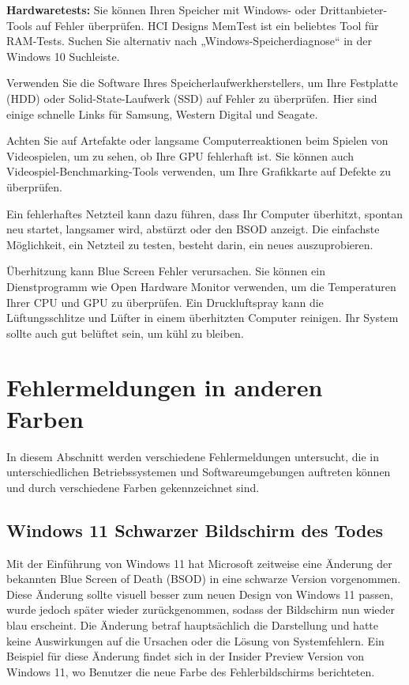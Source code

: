 \documentclass[paper=a4,fontsize=12pt,ngerman,parskip=half]{scrartcl}
\begin{document}
\textbf{Hardwaretests:} Sie können Ihren Speicher mit Windows- oder Drittanbieter-Tools auf Fehler überprüfen. HCI Designs MemTest ist ein beliebtes Tool für RAM-Tests. Suchen Sie alternativ nach „Windows-Speicherdiagnose“ in der Windows 10 Suchleiste.

Verwenden Sie die Software Ihres Speicherlaufwerkherstellers, um Ihre Festplatte (HDD) oder Solid-State-Laufwerk (SSD) auf Fehler zu überprüfen. Hier sind einige schnelle Links für Samsung, Western Digital und Seagate.

Achten Sie auf Artefakte oder langsame Computerreaktionen beim Spielen von Videospielen, um zu sehen, ob Ihre GPU fehlerhaft ist. Sie können auch Videospiel-Benchmarking-Tools verwenden, um Ihre Grafikkarte auf Defekte zu überprüfen.\cite{microsoft_support}

Ein fehlerhaftes Netzteil kann dazu führen, dass Ihr Computer überhitzt, spontan neu startet, langsamer wird, abstürzt oder den BSOD anzeigt. Die einfachste Möglichkeit, ein Netzteil zu testen, besteht darin, ein neues auszuprobieren.

Überhitzung kann Blue Screen Fehler verursachen. Sie können ein Dienstprogramm wie Open Hardware Monitor verwenden, um die Temperaturen Ihrer CPU und GPU zu überprüfen. Ein Druckluftspray kann die Lüftungsschlitze und Lüfter in einem überhitzten Computer reinigen. Ihr System sollte auch gut belüftet sein, um kühl zu bleiben.\cite{microsoft_support}

\pagebreak
\section{Fehlermeldungen in anderen Farben}

In diesem Abschnitt werden verschiedene Fehlermeldungen untersucht, die in unterschiedlichen Betriebssystemen und Softwareumgebungen auftreten können und durch verschiedene Farben gekennzeichnet sind.\cite{wikipedia}

\subsection{Windows 11 Schwarzer Bildschirm des Todes}

Mit der Einführung von Windows 11 hat Microsoft zeitweise eine Änderung der bekannten Blue Screen of Death (BSOD) in eine schwarze Version vorgenommen. Diese Änderung sollte visuell besser zum neuen Design von Windows 11 passen, wurde jedoch später wieder zurückgenommen, sodass der Bildschirm nun wieder blau erscheint. Die Änderung betraf hauptsächlich die Darstellung und hatte keine Auswirkungen auf die Ursachen oder die Lösung von Systemfehlern. Ein Beispiel für diese Änderung findet sich in der Insider Preview Version von Windows 11, wo Benutzer die neue Farbe des Fehlerbildschirms berichteten.\cite{microsoft_forum,warren2021,windows_insider2021}
\end{document}
